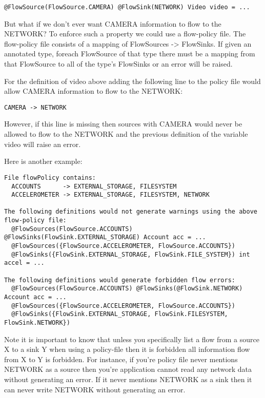 \begin{Verbatim}
@FlowSource(FlowSource.CAMERA) @FlowSink(NETWORK) Video video = ...
\end{Verbatim}

But what if we don't ever want CAMERA information to flow to the
NETWORK? To enforce such a property we could use a flow-policy file.
The flow-policy file consists of a mapping of
FlowSources -> FlowSinks.  If given an annotated type, foreach
FlowSource of that type there must be a mapping from that
FlowSource to all of the type's FlowSinks or an error will be raised.

For the definition of video above adding the following line to the policy
file would allow CAMERA information to flow to the NETWORK:

\begin{Verbatim}
CAMERA -> NETWORK
\end{Verbatim}

However, if this line is missing then sources with CAMERA
would never be allowed to flow to the NETWORK and the previous
definition of the variable video will raise an error.

Here is another example:

\begin{Verbatim}
File flowPolicy contains:
  ACCOUNTS      -> EXTERNAL_STORAGE, FILESYSTEM
  ACCELEROMETER -> EXTERNAL_STORAGE, FILESYSTEM, NETWORK

The following definitions would not generate warnings using the above flow-policy file:
  @FlowSources(FlowSource.ACCOUNTS) @FlowSinks(FlowSink.EXTERNAL_STORAGE) Account acc = ...
  @FlowSources({FlowSource.ACCELEROMETER, FlowSource.ACCOUNTS})
  @FlowSinks({FlowSink.EXTERNAL_STORAGE, FlowSink.FILE_SYSTEM}) int accel = ...

The following definitions would generate forbidden flow errors:
  @FlowSources(FlowSource.ACCOUNTS) @FlowSinks(@FlowSink.NETWORK) Account acc = ...
  @FlowSources({FlowSource.ACCELEROMETER, FlowSource.ACCOUNTS})
  @FlowSinks({FlowSink.EXTERNAL_STORAGE, FlowSink.FILESYSTEM, FlowSink.NETWORK})
\end{Verbatim}

Note it is important to know that unless you specifically list
a flow from a source X to a sink Y when using a policy-file
then it is forbidden all information flow from X to Y is
forbidden.  For instance, if you're policy file never mentions NETWORK
as a source then you're application cannot read any network data without
generating an error.  If it never mentions NETWORK as a sink then
it can never write NETWORK without generating an error.

